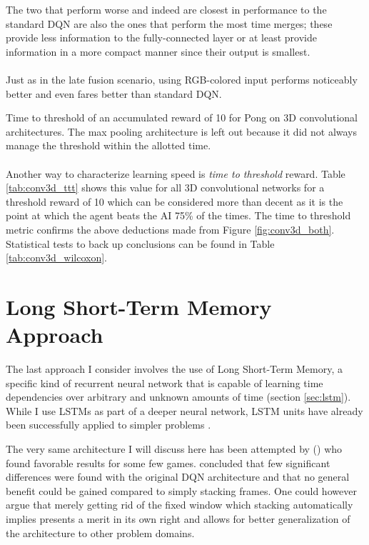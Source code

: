 The two that perform worse and indeed
are closest in performance to the standard DQN
are also the ones that perform the most time merges;
these provide less information to the fully-connected layer
or at least provide information in a more compact manner
since their output is smallest.

\paragraph{}
Just as in the late fusion scenario,
using RGB-colored input performs noticeably better
and even fares better than standard DQN.

\begin{table}
  \center
  \renewcommand{\arraystretch}{1.3}
  
  \caption[3D Conv time to threshold]{
    Time to threshold
    of an accumulated reward of 10
    for Pong
    on 3D convolutional architectures.
    The max pooling architecture is left out
    because it did not always manage the threshold
    within the allotted time.
  }
  \label{tab:conv3d_ttt}
\end{table}

\paragraph{}
Another way to characterize learning speed is
\textit{time to threshold} reward.
Table \ref{tab:conv3d_ttt}
shows this value for all 3D convolutional networks
for a threshold reward of 10
which can be considered more than decent
as it is the point at which
the agent beats the AI
75\% of the times.
The time to threshold metric
confirms the above deductions made
from Figure \ref{fig:conv3d_both}.
Statistical tests to back up conclusions
can be found in Table \ref{tab:conv3d_wilcoxon}.

\section{Long Short-Term Memory Approach}
\label{sec:long_short_term_memory_approach}
The last approach I consider involves
the use of Long Short-Term Memory,
a specific kind of recurrent neural network
that is capable of learning time dependencies
over arbitrary and unknown amounts of time
(section \ref{sec:lstm}).
While I use LSTMs
as part of a deeper neural network,
LSTM units have already been successfully applied
to simpler problems
\parencite{Bakker2001}.

The very same architecture I will discuss here
has been attempted by
\citeauthor{Hausknecht2015} (\citeyear{Hausknecht2015})
who found favorable results for some few games.
\citeauthor{Hausknecht2015}
concluded that few significant differences
were found with the original DQN architecture
and that no general benefit could be gained compared
to simply stacking frames.
One could however argue
that merely getting rid of the fixed window
which stacking automatically implies
presents a merit in its own right
and allows for better generalization of the architecture
to other problem domains.

